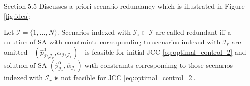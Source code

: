 Section 5.5 Discusses a-priori scenario redundancy which is illustrated in Figure \ref{fig:idea}:

\begin{definition}
\label{def:redundant}
Let $\mathcal{I} = \{1, \dots, N\}$. Scenarios indexed with $\mathcal{I}_r \subset \mathcal{I}$ are called redundant iff a solution of SA with constraints corresponding to scenarios indexed with $\mathcal{I}_r$ are omitted - $(\hat{p}^0_{\mathcal{I} \setminus \mathcal{I}_r}, \hat{\alpha}_{\mathcal{I} \setminus \mathcal{I}_r})$ - is feasible for initial JCC \eqref{eq:optimal_control_2} and solution of SA $(\hat{p}^0_{\mathcal{I}_r}, \hat{\alpha}_{\mathcal{I}_r})$ with constraints corresponding to those scenarios indexed with $\mathcal{I}_r$ is not feasible for JCC \eqref{eq:optimal_control_2}.
\end{definition}


